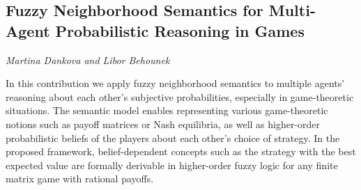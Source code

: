 \documentclass[../booklet.tex]{subfiles}
\begin{document}
\subsection[Fuzzy Neighborhood Semantics for Multi-Agent Probabilistic Reasoning in Games. {\it Martina Dankova and Libor Behounek}]{Fuzzy Neighborhood Semantics for Multi-Agent Probabilistic Reasoning in Games}
 

\begin{center}
  {\it Martina Dankova and Libor Behounek}
\end{center}

\vskip 0.8cm


In this contribution we apply fuzzy neighborhood semantics to multiple agents' reasoning about each other's subjective probabilities, especially in game-theoretic situations. The semantic model enables representing various game-theoretic notions such as payoff matrices or Nash equilibria, as well as higher-order probabilistic beliefs of the players about each other's choice of strategy. In the proposed framework, belief-dependent concepts such as the strategy with the best expected value are formally derivable in higher-order fuzzy logic for any finite matrix game with rational payoffs.

\end{document}
